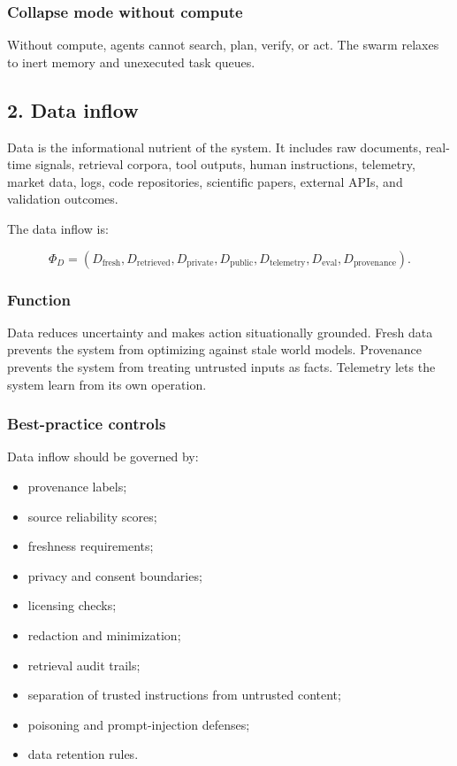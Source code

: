 \subsubsection{Collapse mode without
compute}\label{collapse-mode-without-compute}

Without compute, agents cannot search, plan, verify, or act. The swarm
relaxes to inert memory and unexecuted task queues.

\subsection{2. Data inflow}\label{data-inflow}

Data is the informational nutrient of the system. It includes raw
documents, real-time signals, retrieval corpora, tool outputs, human
instructions, telemetry, market data, logs, code repositories,
scientific papers, external APIs, and validation outcomes.

The data inflow is:

\[
\Phi_D=(D_{\text{fresh}},D_{\text{retrieved}},D_{\text{private}},D_{\text{public}},D_{\text{telemetry}},D_{\text{eval}},D_{\text{provenance}}).
\]

\subsubsection{Function}\label{function-1}

Data reduces uncertainty and makes action situationally grounded. Fresh
data prevents the system from optimizing against stale world models.
Provenance prevents the system from treating untrusted inputs as facts.
Telemetry lets the system learn from its own operation.

\subsubsection{Best-practice controls}\label{best-practice-controls-1}

Data inflow should be governed by:

\begin{itemize}
\tightlist
\item
  provenance labels;
\item
  source reliability scores;
\item
  freshness requirements;
\item
  privacy and consent boundaries;
\item
  licensing checks;
\item
  redaction and minimization;
\item
  retrieval audit trails;
\item
  separation of trusted instructions from untrusted content;
\item
  poisoning and prompt-injection defenses;
\item
  data retention rules.
\end{itemize}

